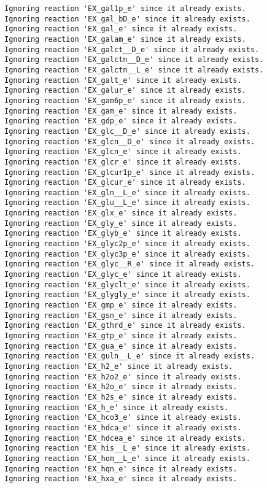 \documentclass[
  letterpaper,
  DIV=11,
  numbers=noendperiod]{scrartcl}
\begin{document}
\begin{verbatim}
Ignoring reaction 'EX_gal1p_e' since it already exists.
Ignoring reaction 'EX_gal_bD_e' since it already exists.
Ignoring reaction 'EX_gal_e' since it already exists.
Ignoring reaction 'EX_galam_e' since it already exists.
Ignoring reaction 'EX_galct__D_e' since it already exists.
Ignoring reaction 'EX_galctn__D_e' since it already exists.
Ignoring reaction 'EX_galctn__L_e' since it already exists.
Ignoring reaction 'EX_galt_e' since it already exists.
Ignoring reaction 'EX_galur_e' since it already exists.
Ignoring reaction 'EX_gam6p_e' since it already exists.
Ignoring reaction 'EX_gam_e' since it already exists.
Ignoring reaction 'EX_gdp_e' since it already exists.
Ignoring reaction 'EX_glc__D_e' since it already exists.
Ignoring reaction 'EX_glcn__D_e' since it already exists.
Ignoring reaction 'EX_glcn_e' since it already exists.
Ignoring reaction 'EX_glcr_e' since it already exists.
Ignoring reaction 'EX_glcur1p_e' since it already exists.
Ignoring reaction 'EX_glcur_e' since it already exists.
Ignoring reaction 'EX_gln__L_e' since it already exists.
Ignoring reaction 'EX_glu__L_e' since it already exists.
Ignoring reaction 'EX_glx_e' since it already exists.
Ignoring reaction 'EX_gly_e' since it already exists.
Ignoring reaction 'EX_glyb_e' since it already exists.
Ignoring reaction 'EX_glyc2p_e' since it already exists.
Ignoring reaction 'EX_glyc3p_e' since it already exists.
Ignoring reaction 'EX_glyc__R_e' since it already exists.
Ignoring reaction 'EX_glyc_e' since it already exists.
Ignoring reaction 'EX_glyclt_e' since it already exists.
Ignoring reaction 'EX_glygly_e' since it already exists.
Ignoring reaction 'EX_gmp_e' since it already exists.
Ignoring reaction 'EX_gsn_e' since it already exists.
Ignoring reaction 'EX_gthrd_e' since it already exists.
Ignoring reaction 'EX_gtp_e' since it already exists.
Ignoring reaction 'EX_gua_e' since it already exists.
Ignoring reaction 'EX_guln__L_e' since it already exists.
Ignoring reaction 'EX_h2_e' since it already exists.
Ignoring reaction 'EX_h2o2_e' since it already exists.
Ignoring reaction 'EX_h2o_e' since it already exists.
Ignoring reaction 'EX_h2s_e' since it already exists.
Ignoring reaction 'EX_h_e' since it already exists.
Ignoring reaction 'EX_hco3_e' since it already exists.
Ignoring reaction 'EX_hdca_e' since it already exists.
Ignoring reaction 'EX_hdcea_e' since it already exists.
Ignoring reaction 'EX_his__L_e' since it already exists.
Ignoring reaction 'EX_hom__L_e' since it already exists.
Ignoring reaction 'EX_hqn_e' since it already exists.
Ignoring reaction 'EX_hxa_e' since it already exists.

\end{verbatim}
\end{document}
